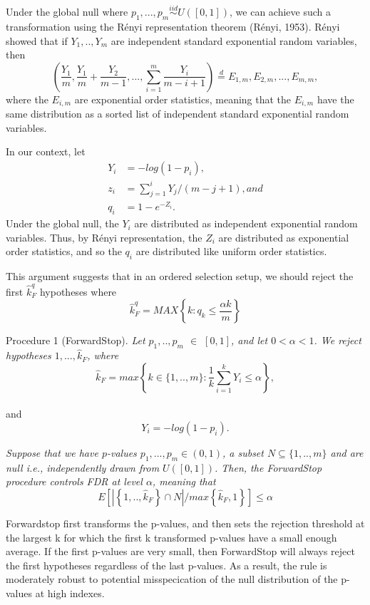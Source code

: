 \documentclass{article}
\begin{document}
Under the global null where $p_1,...,p_m \overset{iid}{\sim} U([0,1])$, we can achieve such a transformation using the R\'enyi representation theorem (R\'enyi, 1953). R\'enyi showed that if $Y_1,..,Y_m$ are independent standard exponential random variables, then
$$ \left(\frac{Y_1}{m}, \frac{Y_1}{m} + \frac{Y_2}{m-1},...,\sum_{i=1}^{m}\frac{Y_i}{m-i+1} \right)\overset{d}{=} E_{1,m},  E_{2,m},..., E_{m,m} ,$$
where the $E_{i,m}$ are exponential order statistics, meaning that the $E_{i,m}$ have the same distribution as a sorted list of independent standard exponential random variables.

In our context, let
\begin{align*}
Y_i &= -log(1-p_i), \\
z_i &=\sum_{j=1}^{i}Y_j/(m-j+1), and  \\
q_i &= 1- e^{-Z_i}. 
\end{align*}
Under the global null, the $Y_i$ are distributed as independent exponential random variables. Thus, by  R\'enyi representation, the $Z_i$ are distributed as exponential order statistics, and so the $q_i$ are distributed like uniform order statistics.

This argument suggests that in an ordered selection setup, we should reject the first $\hat{k}_F^q$ hypotheses where
$$  \hat{k}_F^q = MAX \left\{k: q_k \leq \frac{\alpha k}{m} \right\}   $$

\large{Procedure 1 (ForwardStop).} 	\textit{Let $p_1,..,p_m$ $\in$ $[0,1]$, and let $0 < \alpha <1$. We reject hypotheses $1,..., \hat{k}_F$, where}
$$  \hat{k}_F = max \left\{ k \in \{1,..,m\} : \frac{1}{k}\sum_{i=1}^k Y_i \leq \alpha \right\},$$ \\
   and $$Y_i = -log(1-p_i). $$

\vspace{1cm}
\textit{Suppose that we have $p$-values $p_1,...,p_m \in (0,1)$, a subset $N \subseteq \{1,..,m\}$ and are null i.e., independently drawn from $U([0, 1])$. Then, the ForwardStop procedure controls FDR at level $\alpha$, meaning that}
$$ E \left[\left| \left\{ 1,..,\hat{k}_F\right\}  \cap N \right| \bigg/ max\left\{\hat{k}_F,1 \right\}\right] \leq \alpha $$
\vspace{1cm}

Forwardstop first transforms the p-values, and then sets the rejection threshold at the largest k for which the first k transformed p-values have a small enough average. If the first p-values are very small, then ForwardStop will always reject the first hypotheses regardless
of the last p-values. As a result, the rule is moderately robust to potential misspecication of the null distribution of the p-values at high indexes.
\end{document}
